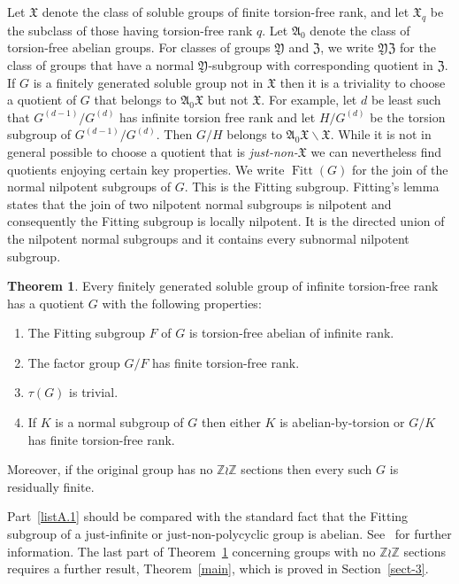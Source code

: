 \documentclass[11pt]{article}
\theoremstyle{definition}
\numberwithin{equation}{section}
\numberwithin{figure}{section}
\numberwithin{table}{section}
\renewcommand{\setminus}{\smallsetminus}
\newtheorem{theor}{Theorem}
\newcommand{\Z}{\mathbb{Z}}
\DeclareMathOperator{\Fitt}{Fitt}
\newcommand*{\romanenumi}{\renewcommand*{\theenumi}{\roman{enumi}}}
\begin{document}
Let $\mathfrak X$ denote the class of soluble groups of finite torsion-free rank, and let $\mathfrak X_q$ be the subclass of those having torsion-free rank $q$. Let $\mathfrak A_0$ denote the class of torsion-free abelian groups. For classes of groups $\mathfrak Y$ and $\mathfrak Z$, we write $\mathfrak{YZ}$ for the class of groups that have a normal $\mathfrak Y$-subgroup with corresponding quotient in $\mathfrak Z$. If $G$ is a finitely generated soluble group not in $\mathfrak X$ then it is a triviality to choose a quotient of $G$ that belongs to $\mathfrak A_0\mathfrak X$ but not $\mathfrak X$. For example, let $d$ be least such that $G^{(d-1)}/G^{(d)}$ has infinite torsion free rank and let $H/G^{(d)}$ be the torsion subgroup of $G^{(d-1)}/G^{(d)}$. Then $G/H$ belongs to $\mathfrak A_0\mathfrak X\setminus\mathfrak X$. While it is not in general possible to choose a quotient that is \emph{just-non-$\mathfrak X$} we can nevertheless find quotients enjoying certain key properties. We write $\Fitt(G)$ for the join of the normal nilpotent subgroups of $G$. This is the Fitting subgroup. Fitting's lemma states that the join of two nilpotent normal subgroups is nilpotent and consequently the Fitting subgroup is locally nilpotent. It is the directed union of the nilpotent normal subgroups and it contains every subnormal nilpotent subgroup.
\setcounter{theor}{0}
\begin{theor}\label{theoa}
Every finitely generated soluble group of infinite torsion-free rank has a quotient $G$ with the following properties:
\begin{enumerate}\romanenumi
\item \label{listA.1}The Fitting subgroup $F$ of $G$ is torsion-free abelian of infinite rank.
\item \label{listA.2}The factor group $G/F$ has finite torsion-free rank.
\item \label{listA.3}$\tau(G)$ is trivial.
\item \label{listA.4}If $K$ is a normal subgroup of $G$ then either $K$ is abelian-by-torsion or $G/K$ has finite torsion-free rank.
\end{enumerate}
Moreover, if the original group has no $\Z\wr\Z$ sections then every such $G$ is residually finite.
\end{theor}

Part~\eqref{listA.1} should be compared with the standard fact that the Fitting subgroup of a just-infinite or just-non-polycyclic group is abelian. See~\cite{RW} for further information. The last part of Theorem~\ref{theoa} concerning groups with no $\Z\wr\Z$ sections requires a further result, Theorem~\ref{main}, which is proved in Section~\ref{sect-3}.
\end{document}
